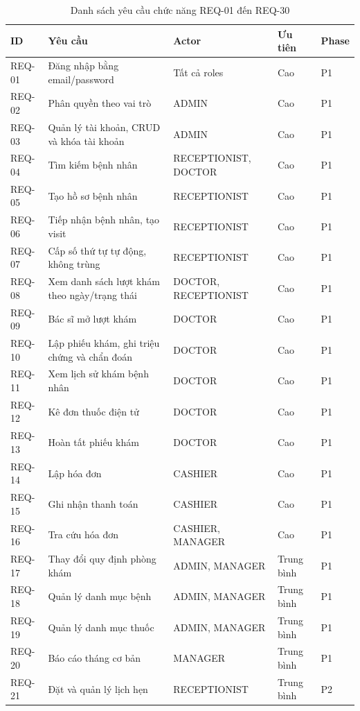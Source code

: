 \begin{longtable}{|p{1.6cm}|p{5.6cm}|p{3cm}|p{1.8cm}|p{1.6cm}|}
\caption{Danh sách yêu cầu chức năng REQ-01 đến REQ-30}\\
\hline
\textbf{ID} & \textbf{Yêu cầu} & \textbf{Actor} & \textbf{Ưu tiên} & \textbf{Phase} \\
\hline
REQ-01 & Đăng nhập bằng email/password & Tất cả roles & Cao & P1 \\
\hline
REQ-02 & Phân quyền theo vai trò & ADMIN & Cao & P1 \\
\hline
REQ-03 & Quản lý tài khoản, CRUD và khóa tài khoản & ADMIN & Cao & P1 \\
\hline
REQ-04 & Tìm kiếm bệnh nhân & RECEPTIONIST, DOCTOR & Cao & P1 \\
\hline
REQ-05 & Tạo hồ sơ bệnh nhân & RECEPTIONIST & Cao & P1 \\
\hline
REQ-06 & Tiếp nhận bệnh nhân, tạo visit & RECEPTIONIST & Cao & P1 \\
\hline
REQ-07 & Cấp số thứ tự tự động, không trùng & RECEPTIONIST & Cao & P1 \\
\hline
REQ-08 & Xem danh sách lượt khám theo ngày/trạng thái & DOCTOR, RECEPTIONIST & Cao & P1 \\
\hline
REQ-09 & Bác sĩ mở lượt khám & DOCTOR & Cao & P1 \\
\hline
REQ-10 & Lập phiếu khám, ghi triệu chứng và chẩn đoán & DOCTOR & Cao & P1 \\
\hline
REQ-11 & Xem lịch sử khám bệnh nhân & DOCTOR & Cao & P1 \\
\hline
REQ-12 & Kê đơn thuốc điện tử & DOCTOR & Cao & P1 \\
\hline
REQ-13 & Hoàn tất phiếu khám & DOCTOR & Cao & P1 \\
\hline
REQ-14 & Lập hóa đơn & CASHIER & Cao & P1 \\
\hline
REQ-15 & Ghi nhận thanh toán & CASHIER & Cao & P1 \\
\hline
REQ-16 & Tra cứu hóa đơn & CASHIER, MANAGER & Cao & P1 \\
\hline
REQ-17 & Thay đổi quy định phòng khám & ADMIN, MANAGER & Trung bình & P1 \\
\hline
REQ-18 & Quản lý danh mục bệnh & ADMIN, MANAGER & Trung bình & P1 \\
\hline
REQ-19 & Quản lý danh mục thuốc & ADMIN, MANAGER & Trung bình & P1 \\
\hline
REQ-20 & Báo cáo tháng cơ bản & MANAGER & Trung bình & P1 \\
\hline
REQ-21 & Đặt và quản lý lịch hẹn & RECEPTIONIST & Trung bình & P2 \\

\end{longtable}

